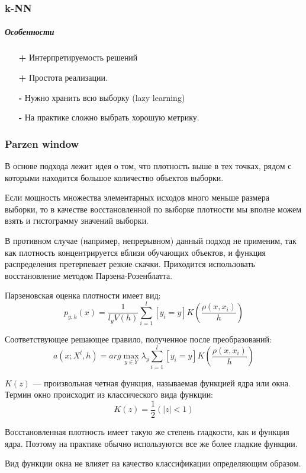 \documentclass[a4paper, 12pt]{article}
\theoremstyle{plain} %
\theoremstyle{definition} %
\theoremstyle{remark} %
\begin{document}
\subsubsection{k-NN}

\subparagraph{Особенности}

\begin{itemize}
	\item[\textbf{+}] Интерпретируемость решений
	\item[\textbf{+}] Простота реализации.
	\item[\textbf{-}] Нужно хранить всю выборку (lazy learning)
	\item[\textbf{-}] На практике сложно выбрать хорошую метрику.
\end{itemize}

\subsubsection{Parzen window}

В основе подхода лежит идея о том, что плотность выше в тех точках, рядом с которыми находится большое количество объектов выборки.

Если мощность множества элементарных исходов много меньше размера выборки, то в качестве восстановленной по выборке плотности мы вполне можем взять и гистограмму значений выборки.

В противном случае (например, непрерывном) данный подход не применим, так как плотность концентрируется вблизи обучающих объектов, и функция распределения претерпевает резкие скачки. Приходится использовать восстановление методом Парзена-Розенблатта.


Парзеновская оценка плотности имеет вид:
\[
p_{y,h}(x) = \frac{1}{l_y V(h)} \sum_{i=1}^l [y_i = y] K(\frac{\rho(x, x_i)}{h})
\]

Соответствующее решающее правило, полученное после преобразований:
\[a(x; X^l, h) = arg \max_{y \in Y} \lambda_y\sum_{i=1}^l [y_i = y] K(\frac{\rho(x, x_i)}{h})
\]

$K(z)$ — произвольная четная функция, называемая функцией ядра или окна. Термин окно происходит из классического вида функции:
\[
K(z) = \frac12 (|z| < 1)
\]

Восстановленная плотность имеет такую же степень гладкости, как и функция ядра. Поэтому на практике обычно используются все же более гладкие функции.

Вид функции окна не влияет на качество классификации определяющим образом.
\end{document}
